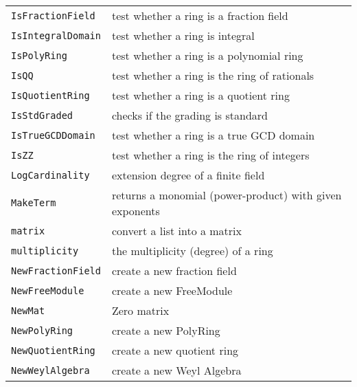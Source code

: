 \documentclass[a4paper]{mybook}
\begin{document}
\begin{center}
\begin{longtable}{ll}
{\verb~IsFractionField~} &
      test whether a ring is a fraction field\\
   
{\verb~IsIntegralDomain~} &
      test whether a ring is integral\\
   
{\verb~IsPolyRing~} &
      test whether a ring is a polynomial ring\\
   
{\verb~IsQQ~} &
      test whether a ring is the ring of rationals\\
   
{\verb~IsQuotientRing~} &
      test whether a ring is a quotient ring\\
   
{\verb~IsStdGraded~} &
      checks if the grading is standard\\
   
{\verb~IsTrueGCDDomain~} &
      test whether a ring is a true GCD domain\\
   
{\verb~IsZZ~} &
      test whether a ring is the ring of integers\\
   
{\verb~LogCardinality~} &
      extension degree of a finite field\\
   
{\verb~MakeTerm~} &
      returns a monomial (power-product) with given exponents\\
   
{\verb~matrix~} &
      convert a list into a matrix\\
   
{\verb~multiplicity~} &
      the multiplicity (degree) of a ring\\
   
{\verb~NewFractionField~} &
      create a new fraction field\\
   
{\verb~NewFreeModule~} &
      create a new FreeModule\\
   
{\verb~NewMat~} &
      Zero matrix\\
   
{\verb~NewPolyRing~} &
      create a new PolyRing\\
   
{\verb~NewQuotientRing~} &
      create a new quotient ring\\
   
{\verb~NewWeylAlgebra~} &
      create a new Weyl Algebra\\
   

\end{longtable}
\end{center}
\end{document}
